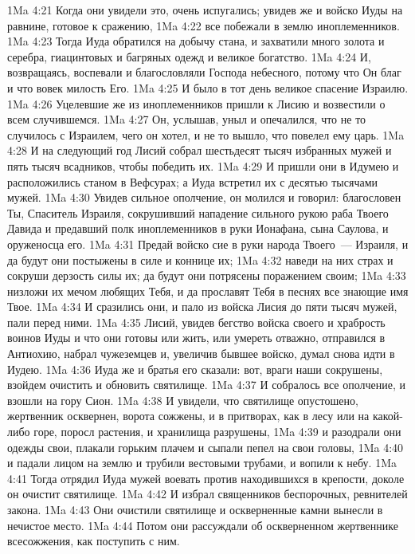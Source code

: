 \vs 1Ma 4:21 Когда они увидели это, очень испугались; увидев же и войско Иуды на равнине, готовое к сражению,
\vs 1Ma 4:22 все побежали в землю иноплеменников.
\vs 1Ma 4:23 Тогда Иуда обратился на добычу стана, и захватили много золота и серебра, гиацинтовых и багряных одежд и великое богатство.
\vs 1Ma 4:24 И, возвращаясь, воспевали и благословляли Господа небесного, потому что Он благ и что вовек милость Его.
\vs 1Ma 4:25 И было в тот день великое спасение Израилю.
\vs 1Ma 4:26 Уцелевшие же из иноплеменников пришли к Лисию и возвестили о всем случившемся.
\vs 1Ma 4:27 Он, услышав, уныл и опечалился, что не то случилось с Израилем, чего он хотел, и не то вышло, что повелел ему царь.
\vs 1Ma 4:28 И на следующий год Лисий собрал шестьдесят тысяч избранных мужей и пять тысяч всадников, чтобы победить их.
\vs 1Ma 4:29 И пришли они в Идумею и расположились станом в Вефсурах; а Иуда встретил их с десятью тысячами мужей.
\vs 1Ma 4:30 Увидев сильное ополчение, он молился и говорил: благословен Ты, Спаситель Израиля, сокрушивший нападение сильного рукою раба Твоего Давида и предавший полк иноплеменников в руки Ионафана, сына Саулова, и оруженосца его.
\vs 1Ma 4:31 Предай войско сие в руки народа Твоего~--- Израиля, и да будут они постыжены в силе и коннице их;
\vs 1Ma 4:32 наведи на них страх и сокруши дерзость силы их; да будут они потрясены поражением своим;
\vs 1Ma 4:33 низложи их мечом любящих Тебя, и да прославят Тебя в песнях все знающие имя Твое.
\vs 1Ma 4:34 И сразились они, и пало из войска Лисия до пяти тысяч мужей, пали перед ними.
\vs 1Ma 4:35 Лисий, увидев бегство войска своего и храбрость воинов Иуды и что они готовы или жить, или умереть отважно, отправился в Антиохию, набрал чужеземцев и, увеличив бывшее войско, думал снова идти в Иудею.
\rsbpar\vs 1Ma 4:36 Иуда же и братья его сказали: вот, враги наши сокрушены, взойдем очистить и обновить святилище.
\vs 1Ma 4:37 И собралось все ополчение, и взошли на гору Сион.
\vs 1Ma 4:38 И увидели, что святилище опустошено, жертвенник осквернен, ворота сожжены, и в притворах, как в лесу или на какой-либо горе, поросл растения, и хранилища разрушены,
\vs 1Ma 4:39 и разодрали они одежды свои, плакали горьким плачем и сыпали пепел на свои головы,
\vs 1Ma 4:40 и падали лицом на землю и трубили вестовыми трубами, и вопили к небу.
\vs 1Ma 4:41 Тогда отрядил Иуда мужей воевать против находившихся в крепости, доколе он очистит святилище.
\vs 1Ma 4:42 И избрал священников беспорочных, ревнителей закона.
\vs 1Ma 4:43 Они очистили святилище и оскверненные камни вынесли в нечистое место.
\vs 1Ma 4:44 Потом они рассуждали об оскверненном жертвеннике всесожжения, как поступить с ним.
